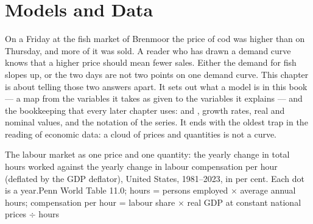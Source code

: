 \chapter{Models and Data}\label{ch:b1:models-and-data}

On a Friday at the fish market of Brenmoor the price of cod was higher
than on Thursday, and more of it was sold. A reader who has drawn a
demand curve knows that a higher price should mean fewer sales. Either the
demand for fish slopes up, or the two days are not two points on one
demand curve. This chapter is about telling those two answers apart. It
sets out what a model is in this book --- a map from the variables it
takes as given to the variables it explains --- and the bookkeeping that
every later chapter uses:  and , growth rates, real and nominal
values, and the notation of the series. It ends with the oldest trap in
the reading of economic data: a cloud of prices and quantities is not a
curve.

\begin{openingchart}{The labour market as one price and one quantity: the yearly
change in total hours worked against the yearly change in labour compensation
per hour (deflated by the GDP deflator), United States, 1981--2023, in per cent.
Each dot is a year.}{Penn World Table 11.0; hours = persons employed $\times$
average annual hours; compensation per hour = labour share $\times$ real GDP at
constant national prices $\div$ hours}
\end{openingchart}

